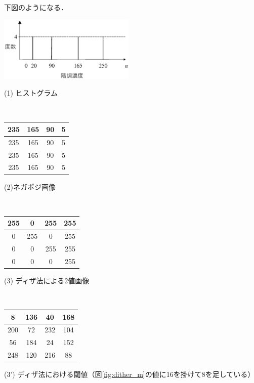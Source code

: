 下図のようになる．
\begin{center}
\begin{minipage}{7cm}
\begin{center}
\includegraphics[width=6.5cm]{fig/image_hist.eps}

(1) ヒストグラム
\end{center}
\end{minipage}\\[.5\baselineskip]
\begin{minipage}{.3\textwidth}
\begin{center}
\begin{tabular}{|c|c|c|c|}
\hline
235 & 165 & 90 & 5 \\
\hline 
235 & 165 & 90 & 5 \\
\hline
235 & 165 & 90 & 5 \\
\hline
235 & 165 & 90 & 5 \\
\hline 
\end{tabular}

(2)ネガポジ画像
\end{center}
\end{minipage}\\[.5\baselineskip]
\begin{minipage}[t]{.3\textwidth}
\begin{center}
\begin{tabular}{|c|c|c|c|}
\hline
255 & 0 & 255 & 255 \\
\hline 
0 & 255 & 0 & 255 \\
\hline
0 & 0 & 255 & 255 \\
\hline
0 & 0 & 0 & 255 \\
\hline 
\end{tabular}

(3) ディザ法による2値画像
\end{center}
\end{minipage}\ \ 
\begin{minipage}[t]{.5\textwidth}
\begin{center}
\begin{tabular}{|c|c|c|c|}
\hline
8 & 136 & 40 & 168 \\
\hline 
200 & 72 & 232 & 104 \\
\hline
56 & 184 & 24 & 152 \\
\hline
248 & 120 & 216 & 88 \\
\hline 
\end{tabular}

(3') ディザ法における閾値（図\ref{fig:dither_m}の値に16を掛けて8を足している）
\end{center}
\end{minipage}

\end{center}




